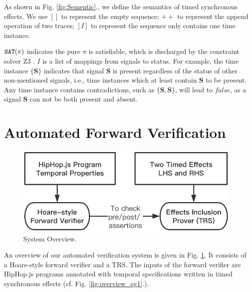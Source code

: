 \documentclass[acmsmall,review,anonymous]{acmart}\settopmatter{printfolios=true,printccs=false,printacmref=false}
\newcommand{\code}[1]{{\tt{\ensuremath{\m{#1}}}}}
\newcommand{\m}{\mathit}
\newcommand\figref[1]{Fig. \textcolor{black}{\ref{#1}}.}
\begin{document}
{As shown in \figref{fig:Sementic}, we define the semantics of timed synchronous effects. 
We use 
$[]$ to represent the empty sequence;
${+}{+}$ to represent the append operation of two traces;
\code{[I]} to represent the sequence only contains one time instance.

\code{{\tt{SAT}(\pi)} } indicates the pure \code{\pi} is satisfiable, which is discharged by the constraint solver Z3 \cite{de2008z3}.  
\code{I} is a list of mappings from signals to status. For example, the time instance $\{\textbf{S}\}$ indicates that signal \textbf{S} is present regardless of the status of other non-mentioned signals, i.e.,  time instances which at least contain $\textbf{S}$ to be present. Any time instance contains contradictions, such as $\{\textbf{S}, \overline{\textbf{S}}\}$, will lead to \code{false}, as a signal {\textbf{S}} can not be both present and absent. 






\section{Automated Forward Verification}\label{sec:Verification}




\begin{figure}
    \vspace{-3mm}
\centering
\includegraphics[width=0.5\columnwidth]{verification.png}
        \vspace{-3mm}
\caption{\label{fig:Verification_oberview}System Overview.}
      \vspace{-1mm}
\end{figure}

An overview of our automated verification system is given in \figref{fig:Verification_oberview} It consists of a Hoare-style forward verifier and a TRS. 
The inputs of the forward verifier are HipHop.js programs annotated with temporal specifications written in timed synchronous effects (cf. \figref{fig:overview_eg1}). 

}
\end{document}
